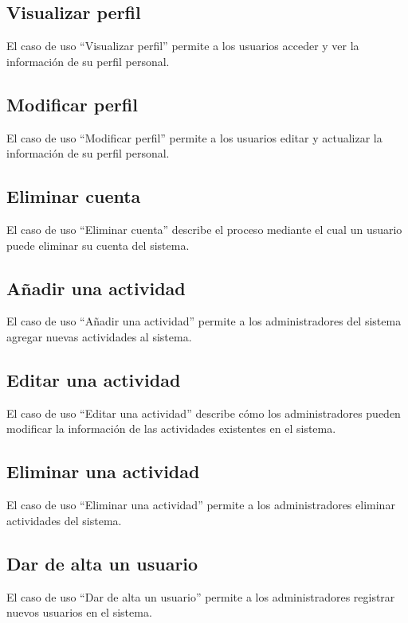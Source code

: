 \subsection{Visualizar perfil}
El caso de uso “Visualizar perfil” permite a los usuarios acceder y ver la información de su perfil personal.

\subsection{Modificar perfil}
El caso de uso “Modificar perfil” permite a los usuarios editar y actualizar la información de su perfil personal.

\subsection{Eliminar cuenta}
El caso de uso “Eliminar cuenta” describe el proceso mediante el cual un usuario puede eliminar su cuenta del sistema.

\subsection{Añadir una actividad}
El caso de uso “Añadir una actividad” permite a los administradores del sistema agregar nuevas actividades al sistema.

\subsection{Editar una actividad}
El caso de uso “Editar una actividad” describe cómo los administradores pueden modificar la información de las actividades existentes en el sistema.

\subsection{Eliminar una actividad}
El caso de uso “Eliminar una actividad” permite a los administradores eliminar actividades del sistema.

\subsection{Dar de alta un usuario}
El caso de uso “Dar de alta un usuario” permite a los administradores registrar nuevos usuarios en el sistema.

